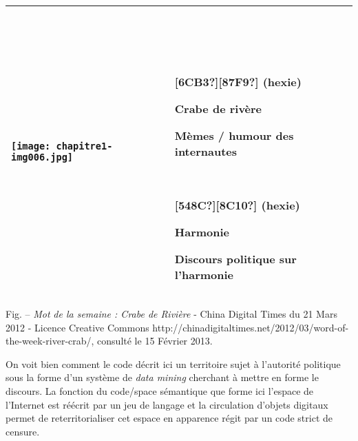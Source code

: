 \begin{flushleft}
\tablefirsthead{}
\tablehead{}
\tabletail{}
\tablelasttail{}
\begin{supertabular}{|m{3.4629598in}|m{2.87956in}|}
\hline
\begin{center}
\texttt{[image: chapitre1-img006.jpg]}
\end{center}
 &
~

~

{\color{black} \textbf{[6CB3?][87F9?]}\textbf{ }\textbf{(hexie)}}

{\bfseries\color{black} Crabe de riv\`ere}

{\color{black} M\`emes / humour des internautes}

~

{\color{black} \textbf{[548C?]}\textbf{[8C10?]}\textbf{ }\textbf{(hexie)}}

{\bfseries\color{black} Harmonie}

{\color{black} Discours politique sur l'harmonie}\\\hline
\end{supertabular}
\end{flushleft}
{\color{black}
Fig. -- \textit{Mot} \textit{de la semaine : Crabe de Rivi\`ere} - China Digital Times du 21 Mars 2012 - Licence
Creative Commons http://chinadigitaltimes.net/2012/03/word-of-the-week-river-crab/, consult\'e le 15 F\'evrier 2013.}


\bigskip

{\color{black}
On voit bien comment le code d\'ecrit ici un territoire sujet \`a l'autorit\'e politique sous la forme d'un syst\`eme de
\textit{data mining} cherchant \`a mettre en forme le discours. La fonction du code/space s\'emantique que forme ici
l{}'espace de l'Internet est r\'e\'ecrit par un jeu de langage et la circulation d'objets digitaux permet de
reterritorialiser cet espace en apparence r\'egit par un code strict de censure. }

